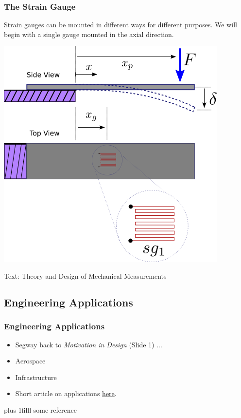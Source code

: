 \documentclass[fleqn]{beamer} %
\newcommand{\sectionIsubsectionIIItitle}{The Strain Gauge}
\newcommand{\sectionIsubsectionIVtitle}{Engineering Applications}
\newcommand{\btVFill}{\vskip0pt plus 1filll}
\begin{document}
			\begin{frame} 
				\frametitle{\sectionIsubsectionIIItitle}

				Strain gauges can be mounted in different ways for different purposes. We will begin with a single gauge mounted in the axial direction. \vspc

				\includegraphics[scale=.4]{images/axial_gaged_beam.png}

				\bigskip
				{\tiny Text: Theory and Design of Mechanical Measurements}

				
			\end{frame}	

		\subsection{\sectionIsubsectionIVtitle}\label{sectionIsubsectionIV}	

			\begin{frame}
				\frametitle{\sectionIsubsectionIVtitle} \scriptsize
				\bigskip

				\begin{itemize}

				\item Segway back to {\it Motivation in Design} (Slide 1) ... \vspc

				\item Aerospace \vspc

				\item Infrastructure \vspc

				\item Short article on applications \href{https://medium.com/@encardio/strain-gauge-principle-types-features-and-applications-357f6fed86a5}{here}. 

				\end{itemize}
			
				\btVFill
				\tiny{some reference}	

			\end{frame}
\end{document}
